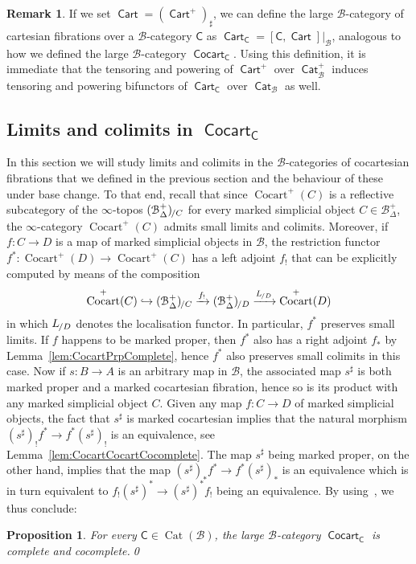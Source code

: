 \documentclass[reqno]{amsart}
\numberwithin{equation}{subsection}
\theoremstyle{plain}
\newtheorem{proposition}[equation]{Proposition}
\theoremstyle{definition}
\newtheorem{remark}[equation]{Remark}
\let\scr=\mathcal
\let\into=\hookrightarrow
\def\BB{\scr B}
\DeclareMathOperator{\Cat}{Cat}
\DeclareMathOperator{\ICat}{\mathsf{Cat}}
\DeclareMathOperator{\Cocart}{Cocart}
\DeclareMathOperator{\ICocart}{\mathsf{Cocart}}
\DeclareMathOperator{\ICart}{\mathsf{Cart}}
\newcommand{\Over}[2]{#1_{\hspace{-1pt}/#2}}
\newcommand{\I}[1]{\mathsf{#1}}
\newcommand{\iFun}[2]{{[#1,#2]}}
\newcommand{\mSimp}[1]{#1_{\Delta}^+}
\begin{document}
\begin{remark}
	\label{rem:definitionCartC}
	If we set $\ICart=(\ICart^+)_\sharp$, we can define the large $\BB$-category of cartesian fibrations over a $\BB$-category $\I{C}$ as $\ICart_{\I{C}}=\iFun{\I{C}}{\ICart}\vert_{\BB}$, analogous to how we defined the large $\BB$-category $\ICocart_{\I{C}}$. Using this definition, it is immediate that the tensoring and powering of $\ICart^+$ over $\ICat_{\BB}^+$ induces tensoring and powering bifunctors of $\ICart_{\I{C}}$ over $\ICat_{\BB}$ as well.
\end{remark}

\subsection{Limits and colimits in $\ICocart_{\I{C}}$}
\label{sec:limitsColimitsCocart}
In this section we will study limits and colimits in the $\BB$-categories of cocartesian fibrations that we defined in the previous section and the behaviour of these under base change. To that end, recall that since  $\Cocart^+(C)$ is a reflective subcategory of the $\infty$-topos $\Over{(\mSimp\BB)}{C}$ for every marked simplicial object $C\in\mSimp\BB$, the $\infty$-category $\Cocart^+(C)$ admits small limits and colimits. Moreover, if $f\colon C\to D$ is a map of marked simplicial objects in $\BB$, the restriction functor $f^\ast\colon \Cocart^+(D)\to\Cocart^+(C)$ has a left adjoint $f_!$ that can be explicitly computed by means of the composition
		\begin{equation*}
		\Cocart^+(C)\into \Over{(\mSimp\BB)}{C}\xrightarrow{f_!} \Over{(\mSimp\BB)}{D} \xrightarrow{\Over{L}{D}}  \Cocart^+(D)
		\end{equation*}
in which $\Over{L}{D}$ denotes the localisation functor. In particular, $f^\ast$ preserves small limits. If $f$ happens to be marked proper, then  $f^\ast$ also has a right adjoint $f_\ast$ by Lemma~\ref{lem:CocartPrpComplete}, hence $f^\ast$ also preserves small colimits in this case. Now if $s\colon B\to A$ is an arbitrary map in $\BB$, the associated map $s^\sharp$ is both marked proper and a marked cocartesian fibration, hence so is its product with any marked simplicial object $C$. Given any map $f\colon C\to D$ of marked simplicial objects, the fact that $s^\sharp$ is marked cocartesian implies that the natural morphism $(s^\sharp)_! f^\ast\to f^\ast (s^\sharp)_!$ is an equivalence, see Lemma~\ref{lem:CocartCocartCocomplete}. The map $s^\sharp$ being marked proper, on the other hand, implies that the map $(s^\sharp)_\ast f^\ast\to f^\ast (s^\sharp)_\ast$ is an equivalence which is in turn equivalent to $f_! (s^\sharp)^\ast\to (s^\sharp)^\ast f_!$ being an equivalence. By using~\cite[Corollary~5.3.6]{Martini2021a}, we thus conclude:
\begin{proposition}
	\label{prop:CocartCocomplete}
	For every $\I{C}\in\Cat(\BB)$, the large $\BB$-category $\ICocart_{\I{C}}$ is complete and cocomplete.\qed
\end{proposition}
\end{document}
